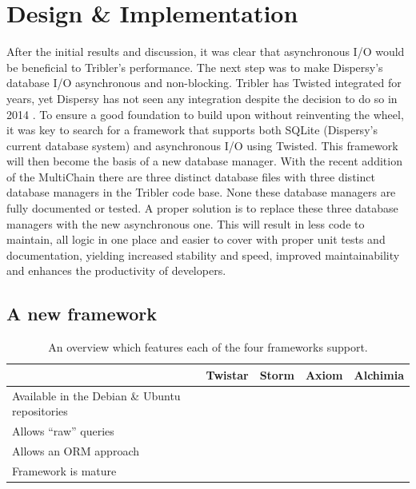 \chapter{Design \& Implementation}

After the initial results and discussion, it was clear that asynchronous I/O would be beneficial to Tribler's performance.
The next step was to make Dispersy's database I/O asynchronous and non-blocking.
Tribler has Twisted integrated for years, yet Dispersy has not seen any integration despite the decision to do so in 2014 \cite{pouwelse2013consider}.
To ensure a good foundation to build upon without reinventing the wheel, it was key to search for a framework that supports both SQLite (Dispersy's current database system) and asynchronous I/O using Twisted.
This framework will then become the basis of a new database manager.
With the recent addition of the MultiChain there are three distinct database files with three distinct database managers in the Tribler code base.
None these database managers are fully documented or tested.
A proper solution is to replace these three database managers with the new asynchronous one.
This will result in less code to maintain, all logic in one place and easier to cover with proper unit tests and documentation, yielding increased stability and speed, improved maintainability and enhances the productivity of developers.

\section{A new framework}

\begin{table}[]
	\centering
	\caption{An overview which features each of the four frameworks support.}
	\label{table:database_frameworks_comparison}
	\begin{tabular}{l|c|c|c|c|}
		\cline{2-5}
		& \textbf{Twistar} & \textbf{Storm} & \textbf{Axiom} & \textbf{Alchimia} \\ \hline
	\multicolumn{1}{|p{4cm}|}{Available in the Debian \& Ubuntu repositories} 	& \xmark & \cmark & \cmark & \xmark \\ \hline
	\multicolumn{1}{|l|}{Allows \enquote{raw} queries} 							& \cmark & \cmark & \cmark & \cmark \\ \hline
	\multicolumn{1}{|l|}{Allows an ORM approach} 								& \cmark & \cmark & \cmark & \xmark \\ \hline
	\multicolumn{1}{|l|}{Framework is mature} 									& \cmark & \cmark & \cmark & \xmark \\ \hline
	\end{tabular}
\end{table}


